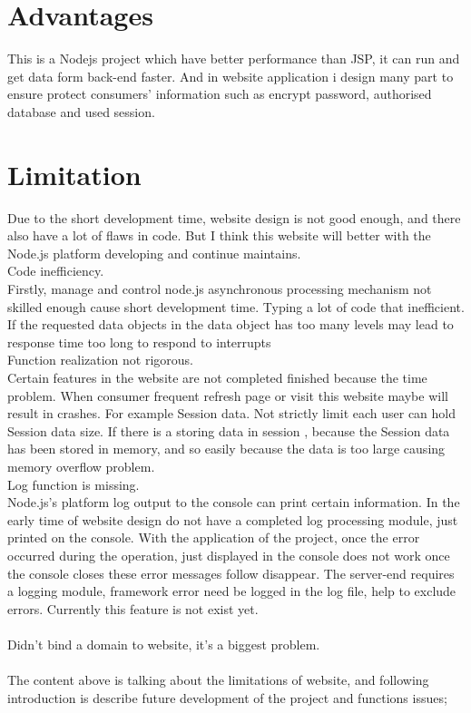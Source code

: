 \section{Advantages}
This is a Nodejs project which have better performance than JSP, it can run and get data form back-end faster. And in website application i design many part to ensure protect consumers' information such as encrypt password, authorised database and used session. \\
\section{Limitation}
Due to the short development time, website design is not good enough, and there also have a lot of flaws in code. But I think this website will better with the Node.js platform developing and continue maintains.\\
Code inefficiency.\\
Firstly, manage and control node.js asynchronous processing mechanism not skilled enough cause short development time. Typing a lot of code that inefficient. If the requested data objects in the data object has too many levels may lead to response time too long to respond to interrupts
\\
Function realization not rigorous.\\
Certain features in the website are not completed finished because the time problem. When consumer frequent refresh page or visit this website maybe will result in crashes. For example  Session data. Not strictly limit each user can hold Session data size. If there is a storing data in session , because the Session data has been stored in memory, and so easily because the data is too large causing memory overflow problem.
\\
Log function is missing.\\
Node.js's platform log output to the console can print certain information. In the early time of website design do not have a completed log processing module, just printed on the console. With the application of the project, once the error occurred during the operation, just displayed in the console does not work once the console closes these error messages follow disappear. The server-end requires a logging module, framework error need be logged in the log file, help to exclude errors. Currently this feature is not exist yet.\\
\\
Didn't bind a domain to website, it's a biggest problem.\\
\\
The content above is talking about the limitations of website, and following introduction is describe future development of the project and functions issues;
\\
